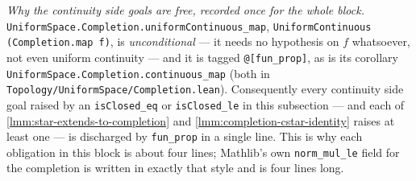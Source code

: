 \begin{definition}
    \emph{Why the continuity side goals are free, recorded once for the whole block.} \texttt{UniformSpace.Completion.uniformContinuous\_map}, \texttt{UniformContinuous (Completion.map f)}, is \emph{unconditional} --- it needs no hypothesis on $f$ whatsoever, not even uniform continuity --- and it is tagged \texttt{@[fun\_prop]}, as is its corollary \texttt{UniformSpace.Completion.continuous\_map} (both in \texttt{Topology/UniformSpace/Completion.lean}). Consequently every continuity side goal raised by an \texttt{isClosed\_eq} or \texttt{isClosed\_le} in this subsection --- and each of \ref{lmm:star-extends-to-completion} and \ref{lmm:completion-cstar-identity} raises at least one --- is discharged by \texttt{fun\_prop} in a single line. This is why each obligation in this block is about four lines; Mathlib's own \texttt{norm\_mul\_le} field for the completion is written in exactly that style and is four lines long.
\end{definition}


